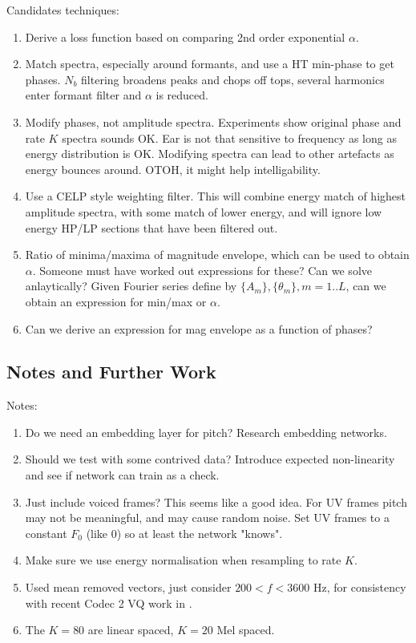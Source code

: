 \documentclass{article}
\begin{document}
Candidates techniques:
\begin{enumerate}
\item Derive a loss function based on comparing 2nd order exponential $\alpha$.
\item Match spectra, especially around formants, and use a HT min-phase to get phases.  $N_b$ filtering broadens peaks and chops off tops, several harmonics enter formant filter and $\alpha$ is reduced.
\item Modify phases, not amplitude spectra.  Experiments show original phase and rate $K$ spectra sounds OK.  Ear is not that sensitive to frequency as long as energy distribution is OK.  Modifying spectra can lead to other artefacts as energy bounces around. OTOH, it might help intelligability.
\item Use a CELP style weighting filter.  This will combine energy match of highest amplitude spectra, with some match of lower energy, and will ignore low energy HP/LP sections that have been filtered out.
\item Ratio of minima/maxima of magnitude envelope, which can be used to obtain $\alpha$.  Someone must have worked out expressions for these?  Can we solve anlaytically?  Given Fourier series define by $\{A_m\}, \{\theta_m\},m=1..L$, can we obtain an expression for min/max or $\alpha$.
\item Can we derive an expression for mag envelope as a function of phases?
\end{enumerate}

\subsection{Notes and Further Work}

Notes:
\begin{enumerate}
\item Do we need an embedding layer for pitch?  Research embedding networks.
\item Should we test with some contrived data?  Introduce expected non-linearity and see if network can train as a check.
\item Just include voiced frames?  This seems like a good idea.  For UV frames pitch may not be meaningful, and may cause random noise. Set UV frames to a constant $F_0$ (like 0) so at least the network "knows".
\item Make sure we use energy normalisation \cite{rowe2023_ratek_study} when resampling to rate $K$.
\item Used mean removed vectors, just consider $200 < f < 3600$ Hz, for consistency with recent Codec 2 VQ work in \cite{rowe2023_ratek_study}.
\item The $K=80$ are linear spaced, $K=20$ Mel spaced.
\end{enumerate}
\end{document}
